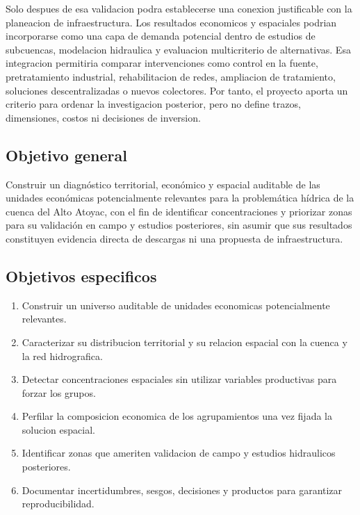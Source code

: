 \documentclass[11pt,letterpaper]{article}
\begin{document}
Solo despues de esa validacion podra establecerse una conexion justificable con la planeacion de infraestructura. Los resultados economicos y espaciales podrian incorporarse como una capa de demanda potencial dentro de estudios de subcuencas, modelacion hidraulica y evaluacion multicriterio de alternativas. Esa integracion permitiria comparar intervenciones como control en la fuente, pretratamiento industrial, rehabilitacion de redes, ampliacion de tratamiento, soluciones descentralizadas o nuevos colectores. Por tanto, el proyecto aporta un criterio para ordenar la investigacion posterior, pero no define trazos, dimensiones, costos ni decisiones de inversion.

\subsection{Objetivo general}

Construir un diagnóstico territorial, económico y espacial auditable de las unidades económicas potencialmente relevantes para la problemática hídrica de la cuenca del Alto Atoyac, con el fin de identificar concentraciones y priorizar zonas para su validación en campo y estudios posteriores, sin asumir que sus resultados constituyen evidencia directa de descargas ni una propuesta de infraestructura.

\subsection{Objetivos especificos}
\begin{enumerate}
    \item Construir un universo auditable de unidades economicas potencialmente relevantes.
    \item Caracterizar su distribucion territorial y su relacion espacial con la cuenca y la red hidrografica.
    \item Detectar concentraciones espaciales sin utilizar variables productivas para forzar los grupos.
    \item Perfilar la composicion economica de los agrupamientos una vez fijada la solucion espacial.
    \item Identificar zonas que ameriten validacion de campo y estudios hidraulicos posteriores.
    \item Documentar incertidumbres, sesgos, decisiones y productos para garantizar reproducibilidad.
\end{enumerate}


\end{document}
